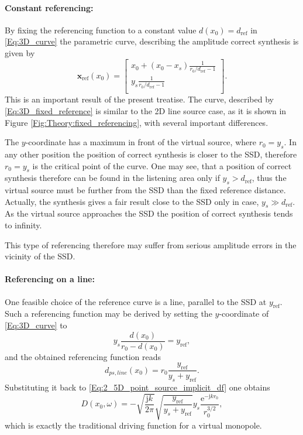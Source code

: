 \documentclass[12pt,a4paper]{article}
\newcommand{\te}{\mathrm{e}}
\newcommand{\ti}{\mathrm{j}}
\newcommand{\yref}{y_{\mathrm{ref}}}
\newcommand{\dref}{d_{\mathrm{ref}}}
\begin{document}
\paragraph{Constant referencing:\\}
By fixing the referencing function to a constant value $d(x_0) = \dref$ in \eqref{Eq:3D_curve} the parametric curve, describing the amplitude correct synthesis is given by
\begin{equation}
\mathbf{x}_{\mathrm{ref}}(x_0)  =  \begin{bmatrix} x_0 + (x_0-x_s)\frac{1}{r_0/\dref - 1 } \\[0.3em] y_s \frac{1}{r_0/\dref - 1}\\[0.3em]    \end{bmatrix}.
\label{Eq:3D_fixed_reference}
\end{equation}
This is an important result of the present treatise. The curve, described by \eqref{Eq:3D_fixed_reference} is similar to the 2D line source case, as it is shown in Figure \ref{Fig:Theory:fixed_referencing}, with several important differences.

The $y$-coordinate has a maximum in front of the virtual source, where $r_0 = y_s$. In any other position the position of correct synthesis is closer to the SSD, therefore $r_0 = y_s$ is the critical point of the curve. One may see, that a position of correct synthesis therefore can be found in the listening area only if $y_s > \dref$, thus the virtual source must be further from the SSD than the fixed reference distance. Actually, the synthesis gives a fair result close to the SSD only in case, $y_s \gg \dref$. As the virtual source approaches the SSD the position of correct synthesis tends to infinity.

This type of referencing therefore may suffer from serious amplitude errors in the vicinity of the SSD.

\paragraph{Referencing on a line:\\}
One feasible choice of the reference curve is a line, parallel to the SSD at $\yref$. Such a referencing function may be derived by setting the $y$-coordinate of \eqref{Eq:3D_curve} to
\begin{equation}
y_s \frac{d(x_0)}{r_0 - d(x_0)} = \yref,
\end{equation}
and the obtained referencing function reads
\begin{equation}
d_{ps,line}(x_0) = r_0 \frac{\yref}{y_s + \yref}.
\end{equation}
Substituting it back to \eqref{Eq:2_5D_point_source_implicit_df} one obtains
\begin{equation}
D(x_0,\omega) = 
- \sqrt{\frac{\ti k}{2\pi}} \sqrt{\frac{\yref}{y_s + \yref}}  y_s \frac{\te^{-\ti k r_0 }}{r_0^{3/2}},
\end{equation}
which is exactly the traditional driving function for a virtual monopole.
\end{document}
